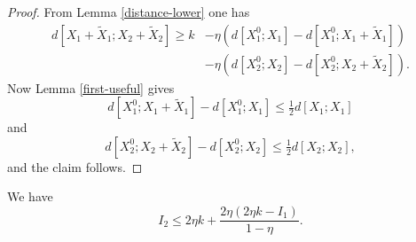 \begin{proof}\leanok From Lemma \ref{distance-lower} one has
\begin{align*}
    d[X_1+\tilde X_1; X_2+\tilde X_2] \geq k &- \eta(d[X^0_1;X_1] - d[X^0_1;X_1+\tilde X_1]) \\
    &- \eta(d[X^0_2;X_2] - d[X^0_2;X_2+\tilde X_2]).
\end{align*}
Now Lemma \ref{first-useful} gives
$$
d[X^0_1;X_1+\tilde X_1] - d[X^0_1;X_1] \leq \tfrac{1}{2} d[X_1;X_1]$$
and
$$
  d[X^0_2;X_2+\tilde X_2] - d[X^0_2;X_2] \leq \tfrac{1}{2} d[X_2;X_2],
$$
and the claim follows.
\end{proof}

\begin{lemma}\label{second-estimate}
  \leanok
We have
$$ I_2 \leq 2 \eta k + \frac{2 \eta (2 \eta k - I_1)}{1 - \eta}.$$
\end{lemma}

